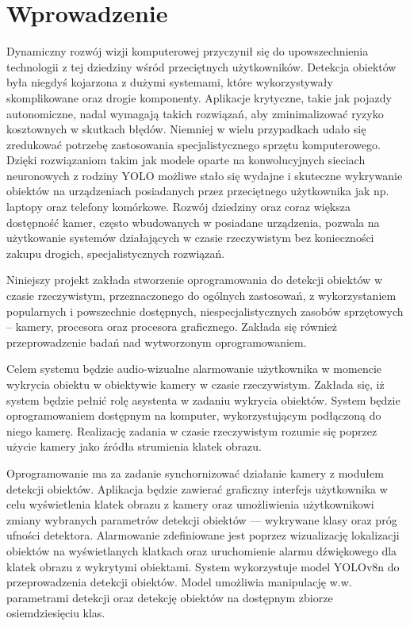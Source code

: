 \chapter{Wprowadzenie}
Dynamiczny rozwój wizji komputerowej przyczynił się do upowszechnienia technologii z tej dziedziny wśród przeciętnych użytkowników. Detekcja obiektów była niegdyś kojarzona z dużymi systemami, które wykorzystywały skomplikowane oraz drogie komponenty. Aplikacje krytyczne, takie jak pojazdy autonomiczne, nadal wymagają takich rozwiązań, aby zminimalizować ryzyko kosztownych w skutkach błędów. Niemniej w wielu przypadkach udało się zredukować potrzebę zastosowania specjalistycznego sprzętu komputerowego. Dzięki rozwiązaniom takim jak modele oparte na konwolucyjnych sieciach neuronowych z rodziny YOLO możliwe stało się wydajne i skuteczne wykrywanie obiektów na urządzeniach posiadanych przez przeciętnego użytkownika jak np. laptopy oraz telefony komórkowe. Rozwój dziedziny oraz coraz większa dostępność kamer, często wbudowanych w posiadane urządzenia, pozwala na użytkowanie systemów działających w czasie rzeczywistym bez konieczności zakupu drogich, specjalistycznych rozwiązań. 

Niniejszy projekt zakłada stworzenie oprogramowania do detekcji obiektów w czasie rzeczywistym, przeznaczonego do ogólnych zastosowań, z wykorzystaniem popularnych i powszechnie dostępnych, niespecjalistycznych zasobów sprzętowych -- kamery, procesora oraz procesora graficznego. Zakłada się również przeprowadzenie badań nad wytworzonym oprogramowaniem.

Celem systemu będzie audio-wizualne alarmowanie użytkownika w momencie wykrycia obiektu w obiektywie kamery w czasie rzeczywistym. Zakłada się, iż system będzie pełnić rolę asystenta w zadaniu wykrycia obiektów. 
System będzie oprogramowaniem dostępnym na komputer, wykorzystującym podłączoną do niego kamerę. Realizację zadania w czasie rzeczywistym rozumie się poprzez użycie kamery jako źródła strumienia klatek obrazu. 

Oprogramowanie ma za zadanie synchornizować działanie kamery z modułem detekcji obiektów. Aplikacja będzie zawierać graficzny interfejs użytkownika w celu wyświetlenia klatek obrazu z kamery oraz umożliwienia użytkownikowi zmiany wybranych parametrów detekcji obiektów --- wykrywane klasy oraz próg ufności detektora. Alarmowanie zdefiniowane jest poprzez wizualizację lokalizacji obiektów na wyświetlanych klatkach oraz uruchomienie alarmu dźwiękowego dla klatek obrazu z wykrytymi obiektami. System wykorzystuje model YOLOv8n do przeprowadzenia detekcji obiektów. Model umożliwia manipulację w.w. parametrami detekcji oraz detekcję obiektów na dostępnym zbiorze osiemdziesięciu klas.  

